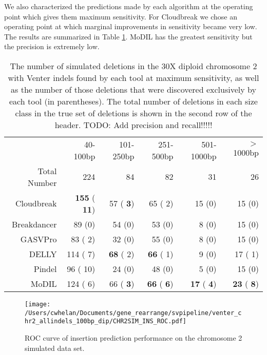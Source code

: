 \documentclass[11pt]{article}
\begin{document}
We also characterized the predictions made by each algorithm at the operating point which gives them maximum sensitivity. For Cloudbreak we chose an operating point at which marginal improvements in sensitivity became very low. The results are summarized in Table \ref{chr2DeletionPredsMaxSensitivity}. MoDIL has the greatest sensitivity but the precision is extremely low.

\begin{table}[t]
\begin{center}
\begin{tabular}{rrrrrr}
  \hline
 & 40-100bp  & 101-250bp  & 251-500bp & 501-1000bp & $>$ 1000bp \\ 
 Total Number & 224 &  84 & 82 &  31 & 26\\ 
  \hline
  Cloudbreak  & \textbf{ 155} (\textbf{  11})  &   57 (\textbf{   3}) &    65 (   2) &   15 (0) &   15 (0) \\ 
  Breakdancer &   89 (0)  &   54 (0) &    53 (0) &    8 (0) &   15 (0) \\ 
  GASVPro     &   83 (   2)  &   32 (0) &    55 (0) &    8 (0) &   15 (0) \\ 
  DELLY       &  114 (   7)  & \textbf{  68} (   2) &  \textbf{  66} (   1) &    9 (0) &   17 (   1) \\ 
  Pindel      &   96 (  10)  &   24 (0) &    48 (0) &    5 (0) &   15 (0)\\ 
  MoDIL      &  124 (   6)  &   66 (\textbf{   3}) &  \textbf{  66} (\textbf{   6}) & \textbf{  17} (\textbf{   4}) & \textbf{  23} (\textbf{   8})\\ 
   \hline
\end{tabular}
\end{center}
\caption{The number of simulated deletions in the 30X diploid chromosome 2 with Venter indels found by each tool at maximum sensitivity, as well as the number of those deletions that were discovered exclusively by each tool (in parentheses). The total number of deletions in each size class in the true set of deletions is shown in the second row of the header. TODO: Add precision and recall!!!!!}
\label{chr2DeletionPredsMaxSensitivity}
\end{table}

\begin{figure}[t]
\centering
\texttt{[image: /Users/cwhelan/Documents/gene\_rearrange/svpipeline/venter\_chr2\_allindels\_100bp\_dip/CHR2SIM\_INS\_ROC.pdf]}
\caption{ROC curve of insertion prediction performance on the chromosome 2 simulated data set.}
\label{chr2InsertionsRoc}
\end{figure}
\end{document}
